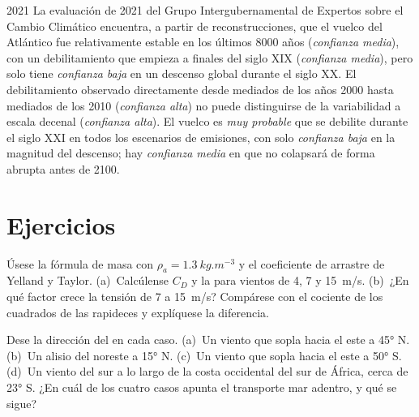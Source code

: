 \begin{dated}{2021}
La evaluación de 2021 del Grupo Intergubernamental de Expertos sobre el Cambio Climático encuentra, a partir de reconstrucciones, que el vuelco del Atlántico fue relativamente estable en los últimos \num{8000} años (\emph{confianza media}), con un debilitamiento que empieza a finales del siglo XIX (\emph{confianza media}), pero solo tiene \emph{confianza baja} en un descenso global durante el siglo XX. El debilitamiento observado directamente desde mediados de los años 2000 hasta mediados de los 2010 (\emph{confianza alta}) no puede distinguirse de la variabilidad a escala decenal (\emph{confianza alta}). El vuelco es \emph{muy probable} que se debilite durante el siglo XXI en todos los escenarios de emisiones, con solo \emph{confianza baja} en la magnitud del descenso; hay \emph{confianza media} en que no colapsará de forma abrupta antes de 2100.
\end{dated}

\section{Ejercicios}

\begin{exercise}[$\star$]\label{exo:b1:ocean-circulation:1}
Úsese la fórmula de masa con $\rho_a = \qty{1.3}{kg.m^{-3}}$ y el coeficiente de arrastre de Yelland y Taylor. (a)~Calcúlense $C_D$ y la  para vientos de 4, 7 y
\qty{15}{m/s}. (b)~¿En qué factor crece la tensión de 7 a \qty{15}{m/s}? Compárese con el cociente de los cuadrados de las rapideces y explíquese la diferencia.
\end{exercise}

\begin{exercise}[$\star$]\label{exo:b1:ocean-circulation:2}
Dese la dirección del  en cada caso. (a)~Un viento que sopla hacia el este a \ang{45} N. (b)~Un alisio del noreste a \ang{15} N. (c)~Un viento que sopla hacia el este a \ang{50} S. (d)~Un viento del sur a lo largo de la costa occidental del sur de África, cerca de \ang{23} S. ¿En cuál de los cuatro casos apunta el transporte mar adentro, y qué se sigue?
\end{exercise}

